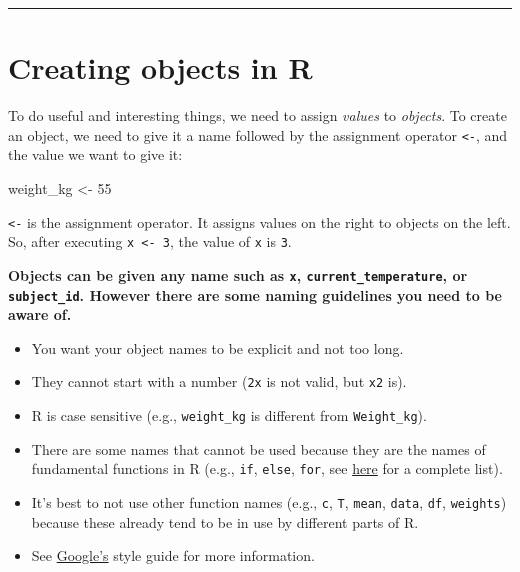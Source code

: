 \documentclass[
]{article}
\newenvironment{Shaded}{\begin{snugshade}}{\end{snugshade}}
\newcommand{\DecValTok}[1]{\textcolor[rgb]{0.00,0.00,0.81}{#1}}
\newcommand{\NormalTok}[1]{#1}
\newcommand{\StringTok}[1]{\textcolor[rgb]{0.31,0.60,0.02}{#1}}
\providecommand{\tightlist}{%
  \setlength{\itemsep}{0pt}\setlength{\parskip}{0pt}}
\begin{document}
\begin{center}\rule{0.5\linewidth}{0.5pt}\end{center}

\hypertarget{creating-objects-in-r}{%
\section{Creating objects in R}\label{creating-objects-in-r}}

To do useful and interesting things, we need to assign \emph{values} to
\emph{objects}. To create an object, we need to give it a name followed
by the assignment operator \texttt{\textless{}-}, and the value we want
to give it:

\begin{Shaded}
\begin{Highlighting}[]
\NormalTok{weight_kg <-}\StringTok{ }\DecValTok{55}
\end{Highlighting}
\end{Shaded}

\texttt{\textless{}-} is the assignment operator. It assigns values on
the right to objects on the left. So, after executing
\texttt{x\ \textless{}-\ 3}, the value of \texttt{x} is \texttt{3}.

\textbf{Objects can be given any name such as \texttt{x},
\texttt{current\_temperature}, or \texttt{subject\_id}. However there
are some naming guidelines you need to be aware of.}

\begin{itemize}
\tightlist
\item
  You want your object names to be explicit and not too long.
\item
  They cannot start with a number (\texttt{2x} is not valid, but
  \texttt{x2} is).
\item
  R is case sensitive (e.g., \texttt{weight\_kg} is different from
  \texttt{Weight\_kg}).
\item
  There are some names that cannot be used because they are the names of
  fundamental functions in R (e.g., \texttt{if}, \texttt{else},
  \texttt{for}, see
  \href{https://stat.ethz.ch/R-manual/R-devel/library/base/html/Reserved.html}{here}
  for a complete list).
\item
  It's best to not use other function names (e.g., \texttt{c},
  \texttt{T}, \texttt{mean}, \texttt{data}, \texttt{df},
  \texttt{weights}) because these already tend to be in use by different
  parts of R.
\item
  See \href{https://google.github.io/styleguide/Rguide.xml}{Google's}
  style guide for more information.
\end{itemize}
\end{document}
